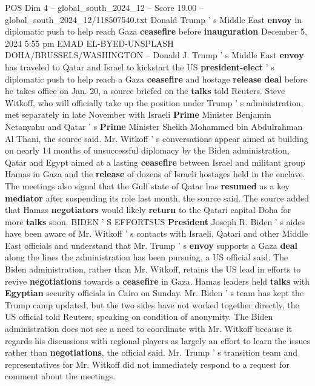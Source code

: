 \begin{textsample}{POS Dim 4 – global\_south\_2024\_12 – Score 19.00 – global\_south\_2024\_12/118507540.txt}  \label{ex:f4_pos_257}
Donald Trump ' s Middle East \textbf{envoy} in diplomatic push to help reach Gaza \textbf{ceasefire} before \textbf{inauguration} December 5, 2024 5:55 pm EMAD EL-BYED-UNSPLASH DOHA/BRUSSELS/WASHINGTON -- Donald J.
Trump ' s Middle East \textbf{envoy} has traveled to Qatar and Israel to kickstart the US \textbf{president-elect} ' s diplomatic push to help reach a Gaza \textbf{ceasefire} and hostage \textbf{release} \textbf{deal} before he takes office on Jan. 20, a source briefed on the \textbf{talks} told Reuters.
Steve Witkoff, who will officially take up the position under Trump ' s administration, met separately in late November with Israeli \textbf{Prime} Minister Benjamin Netanyahu and Qatar ' s \textbf{Prime} Minister Sheikh Mohammed bin Abdulrahman Al Thani, the source said.
Mr.
Witkoff ' s conversations appear aimed at building on nearly 14 months of unsuccessful diplomacy by the Biden administration, Qatar and Egypt aimed at a lasting \textbf{ceasefire} between Israel and militant group Hamas in Gaza and the \textbf{release} of dozens of Israeli hostages held in the enclave.
The meetings also signal that the Gulf state of Qatar has \textbf{resumed} as a key \textbf{mediator} after suspending its role last month, the source said.
The source added that Hamas \textbf{negotiators} would likely \textbf{return} to the Qatari capital Doha for more \textbf{talks} soon.
BIDEN ' S EFFORTSUS \textbf{President} Joseph R.
Biden ' s aides have been aware of Mr.
Witkoff ' s contacts with Israeli, Qatari and other Middle East officials and understand that Mr.
Trump ' s \textbf{envoy} supports a Gaza \textbf{deal} along the lines the administration has been pursuing, a US official said.
The Biden administration, rather than Mr.
Witkoff, retains the US lead in efforts to revive \textbf{negotiations} towards a \textbf{ceasefire} in Gaza.
Hamas leaders held \textbf{talks} with \textbf{Egyptian} security officials in Cairo on Sunday.
Mr.
Biden ' s team has kept the Trump camp updated, but the two sides have not worked together directly, the US official told Reuters, speaking on condition of anonymity.
The Biden administration does not see a need to coordinate with Mr.
Witkoff because it regards his discussions with regional players as largely an effort to learn the issues rather than \textbf{negotiations}, the official said.
Mr.
Trump ' s transition team and representatives for Mr.
Witkoff did not immediately respond to a request for comment about the meetings.

\end{textsample}
